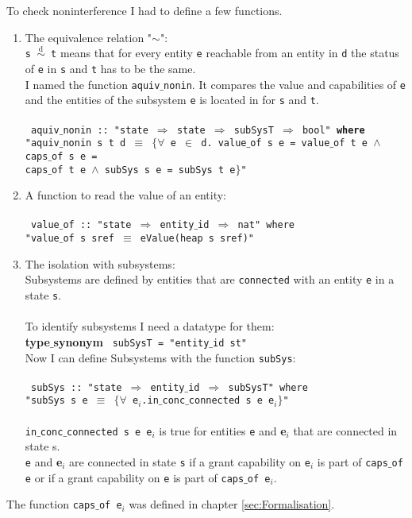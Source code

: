 To check noninterference I had to define a few functions. \\
	
\begin{enumerate}
	
\item The equivalence relation "$\sim$": \\
\texttt{s $\overset{\text{d}}{\sim}$ t} means that for every entity \texttt{e} reachable from an entity in \texttt{d} the status of \texttt{e} in \texttt{s} and \texttt{t} has to be the same. \\

I named the function \texttt{aquiv$\_$nonin}. It compares the value and capabilities of \texttt{e} and the entities of the subsystem \texttt{e} is located in for \texttt{s} and \texttt{t}. \\ \\
{
\texttt{
aquiv$\_$nonin :: "state $\Rightarrow$ state $\Rightarrow$ subSysT $\Rightarrow$ bool" \textbf{where} \\
"aquiv$\_$nonin s t d $\equiv$ $\{\forall$ e $\in$ d. value$\_$of s e = value$\_$of t e $\wedge$ caps$\_$of s e = \\
 caps$\_$of t e $\wedge$ subSys s e = subSys t e$\}$"}} \\

\item A function to read the value of an entity: \\ \\
{
\texttt{
value$\_$of :: "state $\Rightarrow$ entity$\_$id $\Rightarrow$ nat" where \\
"value$\_$of s sref $\equiv$ eValue(heap s sref)"}} \\

\item The isolation with subsystems: \\
Subsystems are defined by entities that are \texttt{connected} with an entity \texttt{e} in a state \texttt{s}. \\ \\
To identify subsystems I need a datatype for them: \\ 

{\textbf{type$\_$synonym}
\texttt{
subSysT = "entity$\_$id st"}} \\ 

Now I can define Subsystems with the function \texttt{subSys}: \\ \\
{
\texttt{
subSys :: "state $\Rightarrow$ entity$\_$id $\Rightarrow$ subSysT" where \\ 
"subSys s e $\equiv$ $\{\forall$ e$_i$.in$\_$conc$\_$connected s e e$_i\}$"}} \\ \\
\texttt{in$\_$conc$\_$connected s e e$_i$} is true for entities \texttt{e} and \textbf{e$_i$} that are connected in state s. \\
\texttt{e} and \textbf{e$_i$} are connected in state \texttt{s} if a grant capability on \texttt{e$_i$} is part of \texttt{caps$\_$of e} or if a grant capability on \texttt{e} is part of \texttt{caps$\_$of e$_i$}.
\end{enumerate} 

The function \texttt{caps$\_$of e$_i$} was defined in chapter \ref{sec:Formalisation}. 